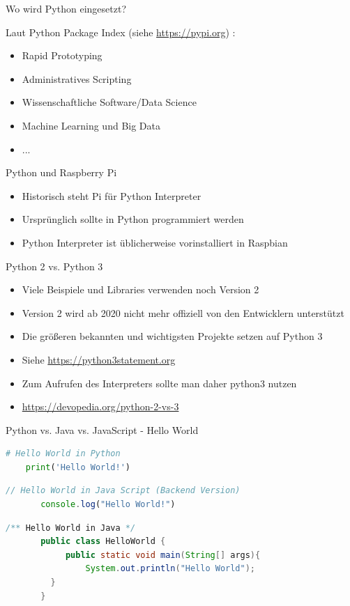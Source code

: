 \begin{frame}{Wo wird Python eingesetzt?}
 
 
 Laut Python Package Index (siehe \url{https://pypi.org}) :

    \begin{itemize}
        \item Rapid Prototyping
        \item Administratives Scripting
        \item Wissenschaftliche Software/Data Science
        \item Machine Learning und Big Data
        \item ...
     \end{itemize}
\end{frame}


\begin{frame}{Python und Raspberry Pi}
    \begin{itemize}
        \item Historisch steht Pi  für Python Interpreter
        \item Ursprünglich sollte in Python programmiert werden
        \item Python Interpreter ist üblicherweise vorinstalliert in Raspbian
     \end{itemize}
\end{frame}

\begin{frame}{Python 2 vs. Python 3}
 
 
    \begin{itemize}
        \item Viele Beispiele und Libraries verwenden noch Version 2
        \item Version 2 wird ab 2020 nicht mehr offiziell von den Entwicklern unterstützt
        \item Die größeren bekannten und wichtigsten Projekte setzen auf Python 3  
        \item Siehe \url{https://python3statement.org}
        \item Zum Aufrufen des Interpreters sollte man daher python3 nutzen
        \item \url{https://devopedia.org/python-2-vs-3}
     \end{itemize}
\end{frame}


\begin{frame}[fragile]{Python vs. Java vs. JavaScript - Hello World}
\begin{lstlisting}[language=Python]
	# Hello World in Python
 	print('Hello World!') 
\end{lstlisting}
\begin{lstlisting}[language=JavaScript]
       // Hello World in Java Script (Backend Version)
       console.log("Hello World!") 
\end{lstlisting}
\begin{lstlisting}[language=Java]
       /** Hello World in Java */
       public class HelloWorld {
      	    public static void main(String[] args){
                System.out.println("Hello World");
      	 }
       }
\end{lstlisting}
\end{frame}

